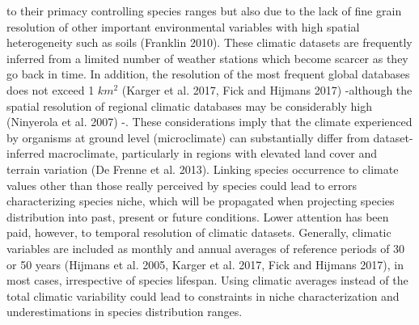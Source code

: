 \documentclass[11pt,twoside]{reedthesis}
\begin{document}
to their primacy controlling species ranges but also due to the lack of
fine grain resolution of other important environmental variables with
high spatial heterogeneity such as soils (Franklin 2010). These climatic
datasets are frequently inferred from a limited number of weather
stations which become scarcer as they go back in time. In addition, the
resolution of the most frequent global databases does not exceed 1
\(km^2\) (Karger et al. 2017, Fick and Hijmans 2017) -although the
spatial resolution of regional climatic databases may be considerably
high (Ninyerola et al. 2007) -. These considerations imply that the
climate experienced by organisms at ground level (microclimate) can
substantially differ from dataset-inferred macroclimate, particularly in
regions with elevated land cover and terrain variation (De Frenne et al.
2013). Linking species occurrence to climate values other than those
really perceived by species could lead to errors characterizing species
niche, which will be propagated when projecting species distribution
into past, present or future conditions. Lower attention has been paid,
however, to temporal resolution of climatic datasets. Generally,
climatic variables are included as monthly and annual averages of
reference periods of 30 or 50 years (Hijmans et al. 2005, Karger et al.
2017, Fick and Hijmans 2017), in most cases, irrespective of species
lifespan. Using climatic averages instead of the total climatic
variability could lead to constraints in niche characterization and
underestimations in species distribution ranges.\par
\end{document}
